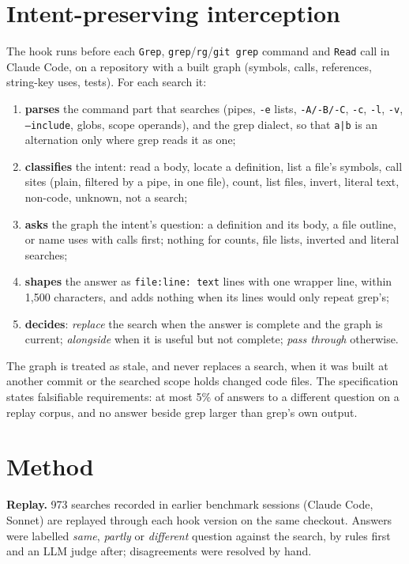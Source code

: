 \documentclass[conference]{IEEEtran}
\begin{document}
\section{Intent-preserving interception}\label{sec:system}
The hook runs before each \texttt{Grep}, \texttt{grep}/\texttt{rg}/\texttt{git grep} command and \texttt{Read} call
in Claude Code, on a repository with a built graph (symbols, calls, references, string-key uses, tests). For each
search it:
\begin{enumerate}
\item \textbf{parses} the command part that searches (pipes, \texttt{-e} lists, \texttt{-A/-B/-C}, \texttt{-c},
  \texttt{-l}, \texttt{-v}, \texttt{--include}, globs, scope operands), and the grep dialect, so that \texttt{a|b} is an
  alternation only where grep reads it as one;
\item \textbf{classifies} the intent: read a body, locate a definition, list a file's symbols, call sites (plain,
  filtered by a pipe, in one file), count, list files, invert, literal text, non-code, unknown, not a search;
\item \textbf{asks} the graph the intent's question: a definition and its body, a file outline, or name uses with calls
  first; nothing for counts, file lists, inverted and literal searches;
\item \textbf{shapes} the answer as \texttt{file:line: text} lines with one wrapper line, within 1{,}500 characters, and
  adds nothing when its lines would only repeat grep's;
\item \textbf{decides}: \emph{replace} the search when the answer is complete and the graph is current;
  \emph{alongside} when it is useful but not complete; \emph{pass through} otherwise.
\end{enumerate}
The graph is treated as stale, and never replaces a search, when it was built at another commit or the searched scope
holds changed code files. The specification states falsifiable requirements: at most 5\% of answers to a different
question on a replay corpus, and no answer beside grep larger than grep's own output.

\section{Method}\label{sec:method}
\textbf{Replay.} 973 searches recorded in earlier benchmark sessions (Claude Code, Sonnet) are replayed through each hook
version on the same checkout. Answers were labelled \emph{same}, \emph{partly} or \emph{different} question against
the search, by rules first and an LLM judge after; disagreements were resolved by hand.
\end{document}
